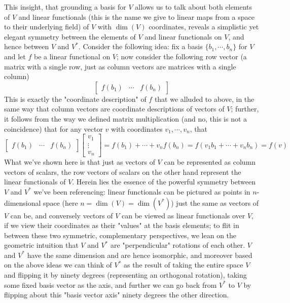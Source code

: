 \documentclass{article}
\newcommand{\nn}{\leavevmode \newline \newline}
\begin{document}
\nn
This insight, that grounding a basis for $ V $ allows us to talk about both elements of $ V $ and linear functionals (this is the name we give to linear maps from a space to their underlying field) of $ V $ with $ \dim(V) $ coordinates, reveals a simplistic yet elegant symmetry between the elements of $ V $ and linear functionals on $ V $, and hence between $ V $ and $ V^* $. Consider the following idea: fix a basis $ \{ b_1, \cdots, b_n \} $ for $ V $ and let $ f $ be a linear functional on $ V $; now consider the following row vector (a matrix with a single row, just as column vectors are matrices with a single column)
	$$ \begin{bmatrix} f(b_1) & \cdots & f(b_n) \end{bmatrix} $$
This is exactly the "coordinate description" of $ f $ that we alluded to above, in the same way that column vectors are coordinate descriptions of vectors of $ V $; further, it follows from the way we defined matrix multiplication (and no, this is not a coincidence) that for any vector $ v $ with coordinates $ v_1, \cdots, v_n $, that
	$$ \begin{bmatrix}
		f(b_1) & \cdots & f(b_n)
	\end{bmatrix} \begin{bmatrix}
		v_1 \\
		\vdots \\
		v_n
	\end{bmatrix} = f(b_1) + \cdots + v_n f(b_n) = f(v_1 b_1 + \cdots + v_n b_n) = f(v) $$
What we've shown here is that just as vectors of $ V $ can be represented as column vectors of scalars, the row vectors of scalars on the other hand represent the linear functionals of $ V $. Herein lies the essence of the powerful symmetry between $ V $ and $ V^* $ we've been referencing: linear functionals can be pictured as points in $ n $-dimensional space (here $ n = \dim(V) = \dim(V^*) $) just the same as vectors of $ V $ can be, and conversely vectors of $ V $ can be viewed as linear functionals over $ V $, if we view their coordinates as their "values" at the basis elements; to flit in between these two symmetric, complementary perspectives, we lean on the geometric intuition that $ V $ and $ V^* $ are "perpendicular" rotations of each other. $ V $ and $ V^* $ have the same dimension and are hence isomorphic, and moreover based on the above ideas we can think of $ V^* $ as the result of taking the entire space $ V $ and flipping it by ninety degrees (representing an orthogonal rotation), taking some fixed basis vector as the axis, and further we can go back from $ V^* $ to $ V $ by flipping about this "basis vector axis" ninety degrees the other direction.
\end{document}
